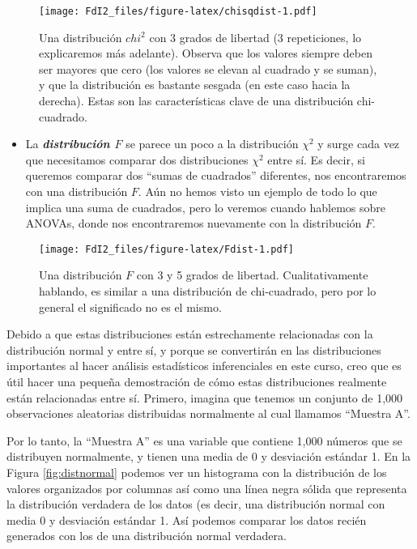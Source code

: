 \documentclass[spanish,]{book}
\providecommand{\tightlist}{%
  \setlength{\itemsep}{0pt}\setlength{\parskip}{0pt}}
\begin{document}
\begin{figure}
\centering
\texttt{[image: FdI2\_files/figure-latex/chisqdist-1.pdf]}
\caption{\label{fig:chisqdist}Una distribución \(chi^2\) con 3 grados de
libertad (3 repeticiones, lo explicaremos más adelante). Observa que los
valores siempre deben ser mayores que cero (los valores se elevan al
cuadrado y se suman), y que la distribución es bastante sesgada (en este
caso hacia la derecha). Estas son las características clave de una
distribución chi-cuadrado.}
\end{figure}

\begin{itemize}
\tightlist
\item
  La \textbf{\emph{distribución \(F\)}} se parece un poco a la
  distribución \(\chi^2\) y surge cada vez que necesitamos comparar dos
  distribuciones \(\chi^2\) entre sí. Es decir, si queremos comparar dos
  ``sumas de cuadrados'' diferentes, nos encontraremos con una
  distribución \(F\). Aún no hemos visto un ejemplo de todo lo que
  implica una suma de cuadrados, pero lo veremos cuando hablemos sobre
  ANOVAs, donde nos encontraremos nuevamente con la distribución \(F\).
\end{itemize}

\begin{figure}
\centering
\texttt{[image: FdI2\_files/figure-latex/Fdist-1.pdf]}
\caption{\label{fig:Fdist}Una distribución \(F\) con 3 y 5 grados de
libertad. Cualitativamente hablando, es similar a una distribución de
chi-cuadrado, pero por lo general el significado no es el mismo.}
\end{figure}

Debido a que estas distribuciones están estrechamente relacionadas con
la distribución normal y entre sí, y porque se convertirán en las
distribuciones importantes al hacer análisis estadísticos inferenciales
en este curso, creo que es útil hacer una pequeña demostración de cómo
estas distribuciones realmente están relacionadas entre sí. Primero,
imagina que tenemos un conjunto de 1,000 observaciones aleatorias
distribuidas normalmente al cual llamamos ``Muestra A''.

Por lo tanto, la ``Muestra A'' es una variable que contiene 1,000
números que se distribuyen normalmente, y tienen una media de 0 y
desviación estándar 1. En la Figura \ref{fig:distnormal} podemos ver un
histograma con la distribución de los valores organizados por columnas
así como una línea negra sólida que representa la distribución verdadera
de los datos (es decir, una distribución normal con media 0 y desviación
estándar 1. Así podemos comparar los datos recién generados con los de
una distribución normal verdadera.
\end{document}
